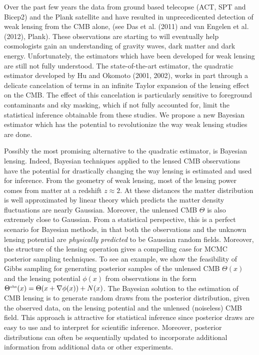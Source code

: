 \documentclass[noinfoline]{imsart}
\begin{document}
 Over the past few years the data from ground based telecopse  (ACT, SPT and Bicep2) and  the Plank satellite and have resulted in unprecedicented detection of weak lensing from the CMB alone, (see Das et al. (2011) and van Engelen  et al. (2012), Plank).  These observations are starting to will eventually help cosmologists gain an understanding of gravity waves, dark matter and dark energy. Unfortunately, the estimators which have been developed for weak lensing are still not fully understood. The state-of-the-art estimator, the quadratic estimator developed by Hu and Okomoto (2001, 2002), works in part through a delicate cancelation of terms in an infinite Taylor expansion of the lensing effect on the CMB. The effect of this cancelation is particularly sensitive to foreground contaminants and sky masking, which  if not fully accounted for,  limit  the statistical inference obtainable from these studies. We propose a  new Bayesian estimator which has the potential to revolutionize the way weak lensing studies are done.  
  


Possibly the most promising alternative to the quadratic estimator, is Bayesian lensing. Indeed, Bayesian techniques applied to the lensed CMB observations have the potential for drastically changing the way lensing is estimated and used for inference. From the geometry of weak lensing, most of the lensing power comes from matter at a redshift $z\approx 2$. At these distances the matter distribution is well approximated by linear theory which predicts the matter density fluctuations are nearly Gaussian. Moreover, the unlensed CMB $\Theta$ is also extremely close to Gaussian.  From a statistical perspective, this is a perfect scenario for Bayesian methods, in that both the observations and the unknown lensing potential are {\em physically predicted} to be Gaussian random fields. 
 Moreover, the structure of the lensing operation gives a compelling case for MCMC posterior sampling techniques.
 To see an example, we show the feasibility of Gibbs sampling for generating posterior samples of the unlensed CMB $\Theta(x)$  and the lensing potential $\phi(x)$ from observations in the form $\Theta^\text{\tiny obs}(x) = \Theta(x+\nabla \phi(x))+ N(x)$.  
The Bayesian solution to the estimation of CMB lensing  is to generate random draws from the posterior distribution, given the observed data, on the lensing potential and the unlensed (noiseless) CMB field. This approach is attractive for statistical inference since posterior draws are easy to use and to interpret for scientific inference. Moreover, posterior distributions can often be sequentially updated to incorporate additional information from additional data or other experiments.
\end{document}
